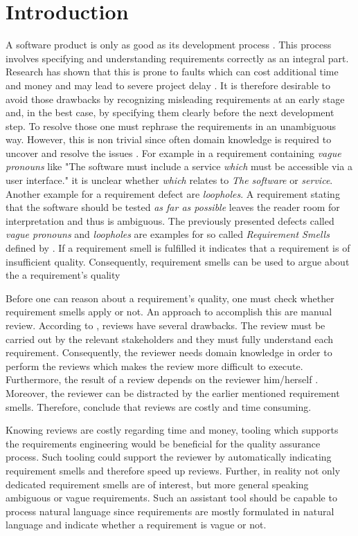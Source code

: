 \chapter{Introduction}
\label{chp:Introduction}
A software product is only as good as its development process \citep{Hsia:1993}.
This process involves specifying and understanding requirements correctly as an integral part.
Research has shown that this is prone to faults which can cost additional time and money \citep{Mendez:2006} and may lead to severe project delay \citep{Femmer:2014}.
It is therefore desirable to avoid those drawbacks by recognizing misleading requirements at an early stage and, in the best case, by specifying them clearly before the next development step.
To resolve those one must rephrase the requirements in an unambiguous way.
However, this is non trivial since often domain knowledge is required to uncover and resolve the issues \citep{Femmer:2017}.
For example in a requirement containing \textit{vague pronouns} like "The software must include a service \textit{which} must be accessible via a user interface." it is unclear whether \textit{which} relates to \textit{The software} or \textit{service}.
Another example for a requirement defect are \textit{loopholes}.
A requirement stating that the software should be tested \textit{as far as possible} leaves the reader room for interpretation and thus is ambiguous.
The previously presented defects called \textit{vague pronouns} and \textit{loopholes} are examples for so called \textit{Requirement Smells} defined by \citet{Femmer:2017}.
If a requirement smell is fulfilled it indicates that a requirement is of insufficient quality.
Consequently, requirement smells can be used to argue about the a requirement's quality

Before one can reason about a requirement's quality, one must check whether requirement smells apply or not.
An approach to accomplish this are manual review.
According to \citet{Salger:2013}, reviews have several drawbacks.
The review must be carried out by the relevant stakeholders and they must fully understand each requirement.
Consequently, the reviewer needs domain knowledge in order to perform the reviews which makes the review more difficult to execute.
Furthermore, the result of a review depends on the reviewer him/herself \citep{Zelkowitz:1983}.
Moreover, the reviewer can be distracted by the earlier mentioned requirement smells.
Therefore, \citet{Femmer:2017} conclude that reviews are costly and time consuming.

Knowing reviews are costly regarding time and money, tooling which supports the requirements engineering would be beneficial for the quality assurance process.
Such tooling could support the reviewer by automatically indicating requirement smells and therefore speed up reviews.
Further, in reality not only dedicated requirement smells are of interest, but more general speaking ambiguous or vague requirements.
Such an assistant tool should be capable to process natural language since requirements are mostly formulated in natural language \citep{Mich:2004} and indicate whether a requirement is vague or not.

